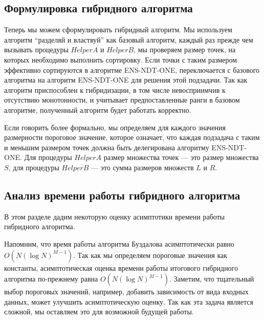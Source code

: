 \subsection{Формулировка гибридного алгоритма}

Теперь мы можем сформулировать гибридный алгоритм. Мы используем алгоритм ``разделяй и властвуй'' как базовый алгоритм, каждый раз прежде чем вызывать процедуры $HelperA$ и $HelperB$, мы проверяем размер точек, на которых необходимо выполнить сортировку. Если точки с таким размером эффективно сортируются в алгоритме ENS-NDT-ONE, переключается с базового алгоритма на алгоритм ENS-NDT-ONE для решения этой подзадачи. Так как алгоритм приспособлен к гибридизации, в том числе невосприимчив к отсутствию монотонности, и учитывает предпоставленные ранги в базовом алгоритме, полученный алгоритм будет работать корректно.

Если говорить более формально, мы определяем для каждого значения размерности пороговое значение, которое означает, что каждая подзадача с таким и меньшим размером точек должна быть делегирована алгоритму ENS-NDT-ONE. Для процедуры $HelperA$ размер множества точек {---} это размер множества $S$, для процедуры $HelperB$ {---} это сумма размеров множеств $L$ и $R$.

\subsection{Анализ времени работы гибридного алгоритма}

В этом разделе дадим некоторую оценку асимптотики времени работы гибридного алгоритма.

Напомним, что время работы алгоритма Буздалова асимптотически равно $O(N(\log N)^{M-1})$. Так как мы определяем пороговые значения как константы, асимптотическая оценка времени работы итогового гибридного  алгоритма по-прежнему равна $O(N(\log N)^{M-1})$. Заметим, что тщательный выбор пороговых значений, например, добавить зависимость от вида входных данных, может улучшить асимптотическую оценку. Так как эта задача является сложной, мы оставляем это для возможной будущей работы.

